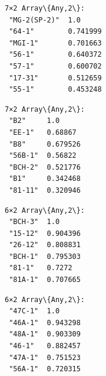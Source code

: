 \documentclass[11pt]{article}
\begin{document}
    \begin{Verbatim}[commandchars=\\\{\}]
7×2 Array\{Any,2\}:
 "MG-2(SP-2)"  1.0
 "64-1"        0.741999
 "MGI-1"       0.701663
 "56-1"        0.640372
 "57-1"        0.600702
 "17-31"       0.512659
 "55-1"        0.453248
    \end{Verbatim}



    \begin{Verbatim}[commandchars=\\\{\}]
7×2 Array\{Any,2\}:
 "B2"     1.0
 "EE-1"   0.68867
 "B8"     0.679526
 "56B-1"  0.56822
 "BCH-2"  0.521776
 "B1"     0.342468
 "81-11"  0.320946
    \end{Verbatim}



    \begin{Verbatim}[commandchars=\\\{\}]
6×2 Array\{Any,2\}:
 "BCH-3"  1.0
 "15-12"  0.904396
 "26-12"  0.808831
 "BCH-1"  0.795303
 "81-1"   0.7272
 "81A-1"  0.707665
    \end{Verbatim}



    \begin{Verbatim}[commandchars=\\\{\}]
6×2 Array\{Any,2\}:
 "47C-1"  1.0
 "46A-1"  0.943298
 "48A-1"  0.903309
 "46-1"   0.882457
 "47A-1"  0.751523
 "56A-1"  0.720315
    \end{Verbatim}


    \begin{center}
    \end{center}
    { \hspace*{\fill} \\}
\end{document}
